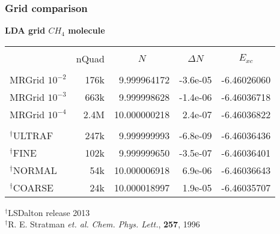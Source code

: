\begin{frame}
\frametitle{Grid comparison}
\centering

\textbf{LDA grid $CH_4$ molecule}
\begin{table}
\centering
\begin{tabular}{lr|rrr}
\hline
\hline
                &       &            &        &           \\
\multicolumn{1}{c}{}&
\multicolumn{1}{c|}{nQuad}&
\multicolumn{1}{c}{$N$}&
\multicolumn{1}{c}{$\Delta N$}&
\multicolumn{1}{c}{$E_{xc}$}\\
                &       &            &        &           \\
MRGrid $10^{-2}$&   176k& 9.999964172&-3.6e-05&-6.46026060\\
MRGrid $10^{-3}$&   663k& 9.999998628&-1.4e-06&-6.46036718\\
MRGrid $10^{-4}$&   2.4M&10.000000218& 2.4e-07&-6.46036822\\
                &       &            &        &           \\
$^\dag$ULTRAF   &   247k& 9.999999993&-6.8e-09&-6.46036436\\
$^\dag$FINE     &   102k& 9.999999650&-3.5e-07&-6.46036401\\
$^\dag$NORMAL   &    54k&10.000006918& 6.9e-06&-6.46036643\\
$^\dag$COARSE   &    24k&10.000018997& 1.9e-05&-6.46035707\\
\hline
\hline
\end{tabular}
\end{table}

\vspace{5mm}

$^\dag$LSDalton release 2013\\
$^\dag$R. E. Stratman {\it et. al.}
{\it Chem. Phys. Lett.}, \textbf{257}, 1996

\end{frame}

